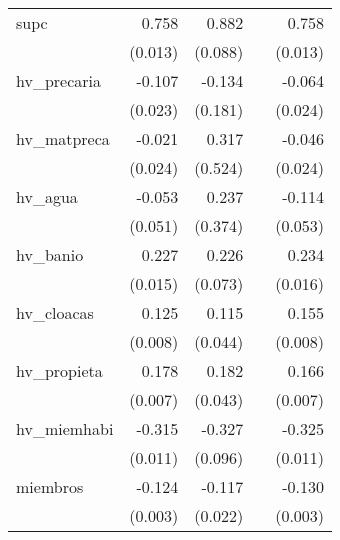 {\begin{longtable}{l*{4}{D{.}{.}{-1}}}
\addlinespace
supc        &       0.758\sym{***}&       0.882\sym{***}&                     &       0.758\sym{***}\\
            &     (0.013)         &     (0.088)         &                     &     (0.013)         \\
\addlinespace
hv\_precaria &      -0.107\sym{***}&      -0.134         &                     &      -0.064\sym{**} \\
            &     (0.023)         &     (0.181)         &                     &     (0.024)         \\
\addlinespace
hv\_matpreca &      -0.021         &       0.317         &                     &      -0.046         \\
            &     (0.024)         &     (0.524)         &                     &     (0.024)         \\
\addlinespace
hv\_agua     &      -0.053         &       0.237         &                     &      -0.114\sym{*}  \\
            &     (0.051)         &     (0.374)         &                     &     (0.053)         \\
\addlinespace
hv\_banio    &       0.227\sym{***}&       0.226\sym{**} &                     &       0.234\sym{***}\\
            &     (0.015)         &     (0.073)         &                     &     (0.016)         \\
\addlinespace
hv\_cloacas  &       0.125\sym{***}&       0.115\sym{**} &                     &       0.155\sym{***}\\
            &     (0.008)         &     (0.044)         &                     &     (0.008)         \\
\addlinespace
hv\_propieta &       0.178\sym{***}&       0.182\sym{***}&                     &       0.166\sym{***}\\
            &     (0.007)         &     (0.043)         &                     &     (0.007)         \\
\addlinespace
hv\_miemhabi &      -0.315\sym{***}&      -0.327\sym{***}&                     &      -0.325\sym{***}\\
            &     (0.011)         &     (0.096)         &                     &     (0.011)         \\
\addlinespace
miembros    &      -0.124\sym{***}&      -0.117\sym{***}&                     &      -0.130\sym{***}\\
            &     (0.003)         &     (0.022)         &                     &     (0.003)         \\

\end{longtable}}
